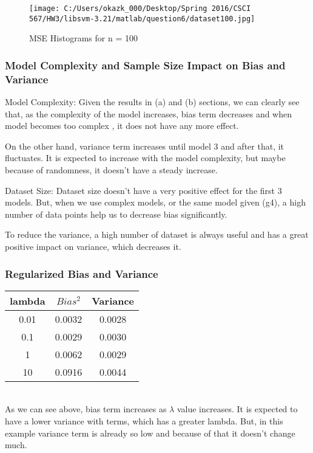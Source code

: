 \documentclass[letter,11pt]{article}
\begin{document}
\begin{figure}[H]%
	\centering
	\texttt{[image: C:/Users/okazk\_000/Desktop/Spring 2016/CSCI 567/HW3/libsvm-3.21/matlab/question6/dataset100.jpg]}
	\caption{MSE Histograms for n = 100}
	\label{fig:test}
\end{figure}

\subsubsection{Model Complexity and Sample Size Impact on Bias and Variance}
	
	Model Complexity: Given the results in (a) and (b) sections, we can clearly see that, as the complexity of the model increases, bias term decreases and when model becomes too complex , it does not have any more effect. 
	
	On the other hand, variance term increases until model 3 and after that, it fluctuates. It is expected to increase with the model complexity, but maybe because of randomness, it doesn't have a steady increase.
	
	Dataset Size: Dataset size doesn't have a very positive effect for the first 3 models. But, when we use complex models, or the same model given (g4), a high number of data points help us to decrease bias significantly.
	
	To reduce the variance, a high number of dataset is always useful and has a great positive impact on variance, which decreases it.
\subsubsection{Regularized Bias and Variance}
\begin{tabular}{|c| c |c |}
	\hline
	lambda & $Bias^2$ & Variance \\ [0.5ex] 			
	\hline
	0.01 & 0.0032  & 0.0028 \\ [0.5ex] 
	\hline
	0.1 & 0.0029   & 0.0030  \\ 
	\hline
	1 &  0.0062   & 0.0029\\
	\hline
	10 & 0.0916    & 0.0044\\
	\hline
\end{tabular}\\

	As we can see above, bias term increases as $\lambda$ value increases. It is expected to have a lower variance with terms, which has a greater lambda. But, in this example variance term is already so low and because of that it doesn't change much.


							
\end{document}
